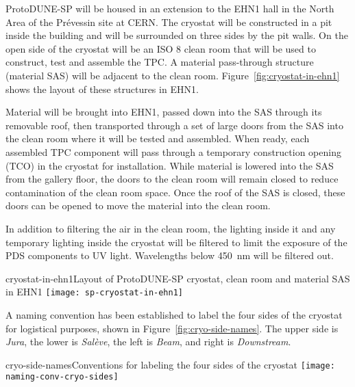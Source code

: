 
\label{ch:spacereq}

ProtoDUNE-SP will be housed in an extension to the EHN1 hall in the North Area of the Pr\'{e}vessin site at CERN. 
The cryostat will be constructed in a pit inside the building and will be surrounded on three sides by the pit walls.  On the open side of the cryostat will be an ISO 8 clean room that will be used to construct, test and assemble the TPC. A material pass-through structure (material SAS) will be adjacent to the clean room. Figure~\ref{fig:cryostat-in-ehn1} shows the layout of these structures in EHN1. 

Material will be brought into EHN1, passed down into the SAS through its removable roof, then transported through a set of large doors from the SAS into the clean room where it will be tested and assembled. When ready, each assembled TPC component will pass through a temporary construction opening (TCO) in the cryostat for installation.
While material is lowered into the SAS from the gallery floor, the doors to the clean room will remain closed to reduce contamination of the clean room space.
Once the roof of the SAS is closed, these doors can be opened to move the material into the clean room.  

In addition to filtering the air in the clean room, the lighting inside it and any temporary lighting inside the cryostat will be filtered to limit the exposure of the PDS components to UV light.  Wavelengths below 450~nm will be filtered out.   

\begin{cdrfigure}{cryostat-in-ehn1}{Layout of ProtoDUNE-SP cryostat, clean room and material SAS in EHN1}
\texttt{[image: sp-cryostat-in-ehn1]}
\end{cdrfigure}

A naming convention has been established to label the four sides of the cryostat for logistical purposes, shown in Figure~\ref{fig:cryo-side-names}.  The upper side is \textit{Jura}, the lower is \textit{Sal\`{e}ve}, the left is \textit{Beam}, and right is \textit{Downstream}.

\begin{cdrfigure}{cryo-side-names}{Conventions for labeling the four sides of the cryostat}
\texttt{[image: naming-conv-cryo-sides]}
\end{cdrfigure}

